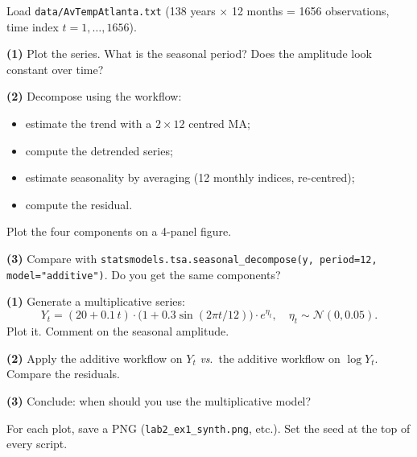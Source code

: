 \documentclass[a4paper,11pt]{article}
\begin{document}
\begin{exercise}
Load \texttt{data/AvTempAtlanta.txt} (138 years $\times$ 12 months
= 1656 observations, time index $t = 1, \dots, 1656$).

\textbf{(1)} Plot the series. What is the seasonal period? Does the
amplitude look constant over time?

\textbf{(2)} Decompose using the workflow:
\begin{itemize}
  \item estimate the trend with a $2 \times 12$ centred MA;
  \item compute the detrended series;
  \item estimate seasonality by averaging (12 monthly indices, re-centred);
  \item compute the residual.
\end{itemize}
Plot the four components on a 4-panel figure.

\textbf{(3)} Compare with \texttt{statsmodels.tsa.seasonal\_decompose(y,
period=12, model="additive")}. Do you get the same components?
\end{exercise}

\begin{exercise}
\textbf{(1)} Generate a multiplicative series:
\[
  Y_t = (20 + 0.1\, t) \cdot \bigl(1 + 0.3 \sin(2\pi t / 12)\bigr) \cdot e^{\eta_t},
  \quad \eta_t \sim \mathcal{N}(0, 0.05).
\]
Plot it. Comment on the seasonal amplitude.

\textbf{(2)} Apply the additive workflow on $Y_t$ \emph{vs}.\ the
additive workflow on $\log Y_t$. Compare the residuals.

\textbf{(3)} Conclude: when should you use the multiplicative model?
\end{exercise}

\bigskip
\begin{warning}
For each plot, save a PNG (\texttt{lab2\_ex1\_synth.png}, etc.). Set
the seed at the top of every script.
\end{warning}
\end{document}
